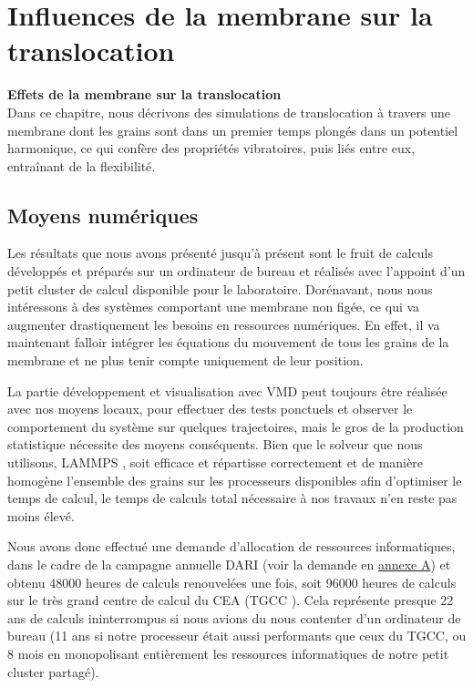 \chapter{Influences de la membrane sur la translocation}
\label{effetsmembrane}

\cleardoublepage

{\Large\textbf{{Effets de la membrane sur la translocation}}}\\

\lettrine[loversize=0.6,lraise=0.1,findent=0.5em,nindent=0em]{D}{}ans ce chapitre, nous décrivons des simulations de translocation à travers une membrane dont les grains sont dans un premier temps plongés dans un potentiel harmonique, ce qui confère des propriétés vibratoires, puis liés entre eux, entraînant de la flexibilité.\\

\minitoc

\newpage

\section{Moyens numériques}

Les résultats que nous avons présenté jusqu'à présent sont le fruit de calculs développés et préparés sur un ordinateur de bureau et réalisés avec l'appoint d'un petit cluster de calcul disponible pour le laboratoire. Dorénavant, nous nous intéressons à des systèmes comportant une membrane non figée, ce qui va augmenter drastiquement les besoins en ressources numériques. En effet, il va maintenant falloir intégrer les équations du mouvement de tous les grains de la membrane et ne plus tenir compte uniquement de leur position.


La partie développement et visualisation avec VMD \cite{HUMP96,STON2001} peut toujours être réalisée avec nos moyens locaux, pour effectuer des tests ponctuels et observer le comportement du système sur quelques trajectoires, mais le gros de la production statistique nécessite des moyens conséquents. Bien que le solveur que nous utilisons, LAMMPS \cite{lammps}, soit efficace et répartisse correctement et de manière homogène l'ensemble des grains sur les processeurs disponibles afin d'optimiser le temps de calcul, le temps de calculs total nécessaire à nos travaux n'en reste pas moins élevé.

Nous avons donc effectué une demande d'allocation de ressources informatiques, dans le cadre de la campagne annuelle DARI \cite{dari} (voir la demande en \hyperref[annexea]{annexe A}) et obtenu 48000 heures de calculs renouvelées une fois, soit 96000 heures de calculs sur le très grand centre de calcul du CEA (TGCC \cite{tgcc}). Cela représente presque 22 ans de calculs ininterrompus si nous avions du nous contenter d'un ordinateur de bureau (11 ans si notre processeur était aussi performants que ceux du TGCC, ou 8 mois en monopolisant entièrement les ressources informatiques de notre petit cluster partagé).

